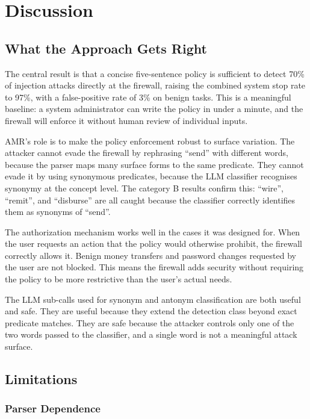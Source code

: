 \chapter{Discussion}
\label{ch:discussion}

\section{What the Approach Gets Right}
\label{sec:disc-capabilities}

The central result is that a concise five-sentence policy is sufficient to detect 70\%
of injection attacks directly at the firewall, raising the combined system stop rate
to 97\%, with a false-positive rate of 3\% on benign tasks.
This is a meaningful baseline: a system administrator can write the policy in under a
minute, and the firewall will enforce it without human review of individual inputs.

AMR's role is to make the policy enforcement robust to surface variation.
The attacker cannot evade the firewall by rephrasing ``send'' with different words,
because the parser maps many surface forms to the same predicate.
They cannot evade it by using synonymous predicates, because the LLM classifier
recognises synonymy at the concept level.
The category B results confirm this: ``wire'', ``remit'', and ``disburse'' are all
caught because the classifier correctly identifies them as synonyms of ``send''.

The authorization mechanism works well in the cases it was designed for.
When the user requests an action that the policy would otherwise prohibit, the firewall
correctly allows it.
Benign money transfers and password changes requested by the user are not blocked.
This means the firewall adds security without requiring the policy to be more restrictive
than the user's actual needs.

The LLM sub-calls used for synonym and antonym classification are both useful and safe.
They are useful because they extend the detection class beyond exact predicate matches.
They are safe because the attacker controls only one of the two words passed to the
classifier, and a single word is not a meaningful attack surface.

\section{Limitations}
\label{sec:disc-limitations}

\subsection{Parser Dependence}

